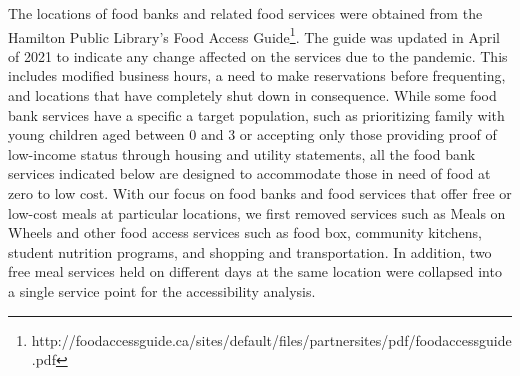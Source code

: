 \documentclass[]{elsarticle} %
\begin{document}
The locations of food banks and related food services were obtained from
the Hamilton Public Library's Food Access Guide\footnote{http://foodaccessguide.ca/sites/default/files/partnersites/pdf/foodaccessguide.pdf}.
The guide was updated in April of 2021 to indicate any change affected
on the services due to the pandemic. This includes modified business
hours, a need to make reservations before frequenting, and locations
that have completely shut down in consequence. While some food bank
services have a specific a target population, such as prioritizing
family with young children aged between 0 and 3 or accepting only those
providing proof of low-income status through housing and utility
statements, all the food bank services indicated below are designed to
accommodate those in need of food at zero to low cost. With our focus on
food banks and food services that offer free or low-cost meals at
particular locations, we first removed services such as Meals on Wheels
and other food access services such as food box, community kitchens,
student nutrition programs, and shopping and transportation. In
addition, two free meal services held on different days at the same
location were collapsed into a single service point for the
accessibility analysis.
\end{document}
